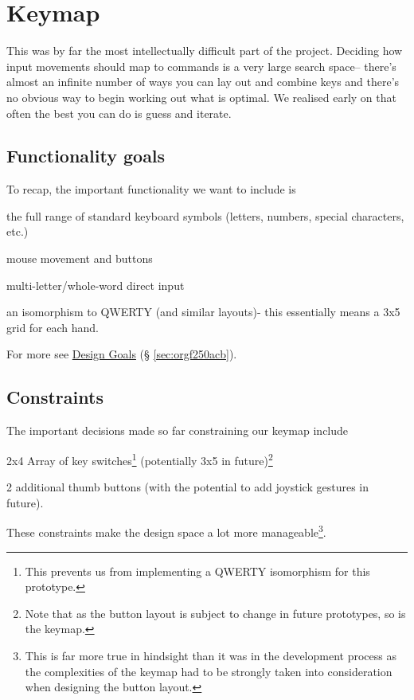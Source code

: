 \documentclass[logo,bsc,singlespacing,parskip]{infthesis}
\begin{document}
\section{Keymap}
\label{sec:org5385a41}
This was by far the most intellectually difficult part of the project.
Deciding how input movements should map to commands is a very large search space-- there's almost an infinite number of ways you can lay out and combine keys and there's no obvious way to begin working out what is optimal.
We realised early on that often the best you can do is guess and iterate.

\subsection{Functionality goals}
\label{sec:org9279934}
To recap, the important functionality we want to include is
\begin{enumerate*}[label={\arabic*)}, itemjoin={, \,}, itemjoin*={, and \,}]
\item the full range of standard keyboard symbols (letters, numbers, special characters, etc.)
\item mouse movement and buttons
\item multi-letter/whole-word direct input
\item an isomorphism to QWERTY (and similar layouts)- this essentially means a 3x5 grid for each hand.
\end{enumerate*}
For more see \hyperref[sec:orgf250acb]{Design Goals} (§ \ref{sec:orgf250acb}).

\subsection{Constraints}
\label{sec:org135edb0}
The important decisions made so far constraining our keymap include
\begin{enumerate*}[label={\arabic*)}, itemjoin={, \,}, itemjoin*={, and \,}]
\item 2x4 Array of key switches\footnote{This prevents us from implementing a QWERTY isomorphism for this prototype.} (potentially 3x5 in future)\footnote{Note that as the button layout is subject to change in future prototypes, so is the keymap.}
\item 2 additional thumb buttons (with the potential to add joystick gestures in future).
\end{enumerate*}
These constraints make the design space a lot more manageable\footnote{This is far more true in hindsight than it was in the development process as the complexities of the keymap had to be strongly taken into consideration when designing the button layout.}.
\end{document}
